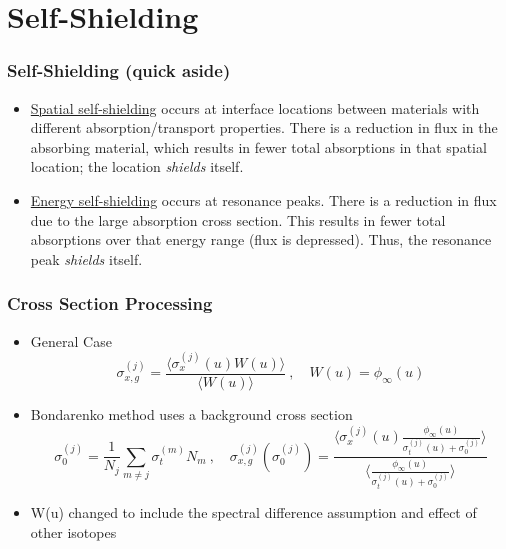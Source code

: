 \documentclass[xcolor=x11names,compress]{beamer}
\renewcommand{\(}{\begin{columns}}
\renewcommand{\)}{\end{columns}}
\newcommand{\<}[1]{\begin{column}{#1}}
\renewcommand{\>}{\end{column}}
\newcommand{\micro}{\ensuremath{\sigma}}
\begin{document}
\section{Self-Shielding}
\begin{frame}[fragile]
  \frametitle{Self-Shielding (quick aside)}

	\begin{itemize}
	\item \underline{Spatial self-shielding} occurs at interface locations between materials with different absorption/transport properties. There is a reduction in flux in the absorbing material, which results in fewer total absorptions in that spatial location; the location \textit{shields} itself. \vspace*{1em}
	
	\item \underline{Energy self-shielding} occurs at resonance peaks. There is a reduction in flux due to the large absorption cross section. This results in fewer total absorptions over that energy range (flux is depressed). Thus, the resonance peak \textit{shields} itself.
	\end{itemize}

	
\end{frame}

\begin{frame}[fragile]
  \frametitle{Cross Section Processing \cite{Bondarenko1964}}

	\begin{itemize}
	\item General Case
	\begin{equation}
  	\micro_{x,g}^{(j)} = \frac{\langle \micro_x^{(j)}(u) W(u)\rangle}
	{\langle W(u)\rangle} \:, \quad W(u) = \phi_{\infty}(u)
 	 \label{eq:baseBondarenko}
 	\end{equation} 
 	
 	\pause
 	\item Bondarenko method uses a background cross section
 	\begin{equation}
  	\micro_0^{(j)} = \frac{1}{N_j} \sum_{m \ne j} \micro_{t}^{(m)} N_m 
  	\:, \quad \micro_{x,g}^{(j)}(\micro_0^{(j)}) = \frac{\langle
  	 \micro_{x}^{(j)}(u) \frac{\phi_{\infty}(u)} {\micro_{t}^{(j)}(u)
  	 + \micro_0^{(j)}} \rangle}
  	 { \langle \frac{\phi_{\infty}(u)}{\micro_{t}^{(j)}(u) +
  	 \micro_0^{(j)}}\rangle}
  \label{eq:ssfact}
	\end{equation}
	\item W(u) changed to include the  spectral difference assumption and effect of other isotopes
	\end{itemize}
	
\end{frame}
	
\end{document}
